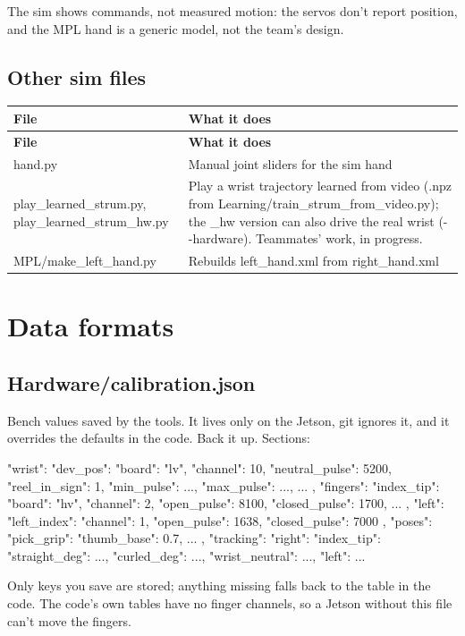 \documentclass[11pt,letterpaper]{article}
\newcommand{\code}[1]{\textcolor{codeblue}{\ttfamily\smaller\relax #1}}
\begin{document}
The sim shows commands, not measured motion: the servos don't report position, and the MPL hand is a generic model, not the team's design.


\subsection{Other sim files}
{\small
\begin{longtable}{|>{\raggedright\arraybackslash}p{}|>{\raggedright\arraybackslash}p{}|}
\hline
\rowcolor{tblhead}\textbf{File} & \textbf{What it does} \\ \hline
\endfirsthead
\hline
\rowcolor{tblhead}\textbf{File} & \textbf{What it does} \\ \hline
\endhead
\code{hand.py} & Manual joint sliders for the sim hand \\ \hline
\code{play\_\allowbreak{}learned\_\allowbreak{}strum.py}, \code{play\_\allowbreak{}learned\_\allowbreak{}strum\_\allowbreak{}hw.py} & Play a wrist trajectory learned from video (\code{.npz} from \code{Learning/\allowbreak{}train\_\allowbreak{}strum\_\allowbreak{}from\_\allowbreak{}video.py}); the \code{\_\allowbreak{}hw} version can also drive the real wrist (\code{-{}-{}hardware}). Teammates' work, in progress. \\ \hline
\code{MPL/\allowbreak{}make\_\allowbreak{}left\_\allowbreak{}hand.py} & Rebuilds \code{left\_\allowbreak{}hand.xml} from \code{right\_\allowbreak{}hand.xml} \\ \hline
\end{longtable}}


\section{Data formats}

\subsection{Hardware/calibration.json}
Bench values saved by the tools. It lives only on the Jetson, git ignores it, and it overrides the defaults in the code. Back it up. Sections:

\begin{codeblock}
{
  "wrist":   { "dev_pos": {"board": "lv", "channel": 10, "neutral_pulse": 5200,
                           "reel_in_sign": 1, "min_pulse": ..., "max_pulse": ...}, ... },
  "fingers": { "index_tip": {"board": "hv", "channel": 2,
                             "open_pulse": 8100, "closed_pulse": 1700}, ... },
  "left":    { "left_index": {"channel": 1, "open_pulse": 1638, "closed_pulse": 7000} },
  "poses":   { "pick_grip": {"thumb_base": 0.7, ...} },
  "tracking":{ "right": {"index_tip": {"straight_deg": ..., "curled_deg": ...},
                         "wrist_neutral": ...}, "left": {...} }
}
\end{codeblock}
Only keys you save are stored; anything missing falls back to the table in the code. The code's own tables have no finger channels, so a Jetson without this file can't move the fingers.
\end{document}

